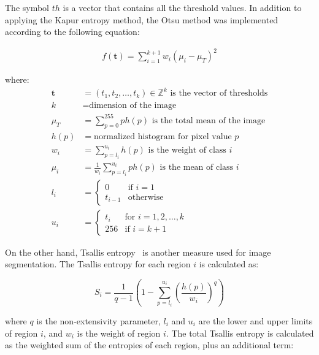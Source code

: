 \documentclass{elsarticle}
\begin{document}
The symbol $th$ is a vector that contains all the threshold values. In addition to applying the Kapur entropy method, the Otsu method was implemented according to the following equation:

\begin{equation}
\begin{gathered}
f(\mathbf{t})=\sum_{i=1}^{k+1} w_i (\mu_i - \mu_T)^2 
\end{gathered}
\end{equation}

\noindent
where:
\begin{equation}
\begin{aligned}
\mathbf{t} &= (t_1, t_2, \dots, t_k) \in \mathbb{Z}^k \text{ is the vector of thresholds} \\
k &= \text{dimension of the image} \\
\mu_T &= \sum_{p=0}^{255} p h(p) \text{ is the total mean of the image} \\
h(p) &= \text{normalized histogram for pixel value } p \\
w_i &= \sum_{p=l_i}^{u_i} h(p) \text{ is the weight of class } i \\
\mu_i &= \frac{1}{w_i} \sum_{p=l_i}^{u_i} p h(p) \text{ is the mean of class } i \\
l_i &= \begin{cases}
0 & \text{if } i = 1 \\
t_{i-1} & \text{otherwise}
\end{cases} \\
u_i &= \begin{cases}
t_i & \text{for } i = 1, 2, \dots, k \\
256 & \text{if } i = k+1
\end{cases}
\end{aligned}
\end{equation}

On the other hand, Tsallis entropy~\cite{KaushikPancholi2023} is another measure used for image segmentation. The Tsallis entropy for each region $i$ is calculated as:

\begin{equation}
S_i = \frac{1}{q-1}\left(1 - \sum_{p=l_i}^{u_i} \left(\frac{h(p)}{w_i}\right)^q\right)
\end{equation}

\noindent 
where $q$ is the non-extensivity parameter, $l_i$ and $u_i$ are the lower and upper limits of region $i$, and $w_i$ is the weight of region $i$. The total Tsallis entropy is calculated as the weighted sum of the entropies of each region, plus an additional term:
\end{document}

